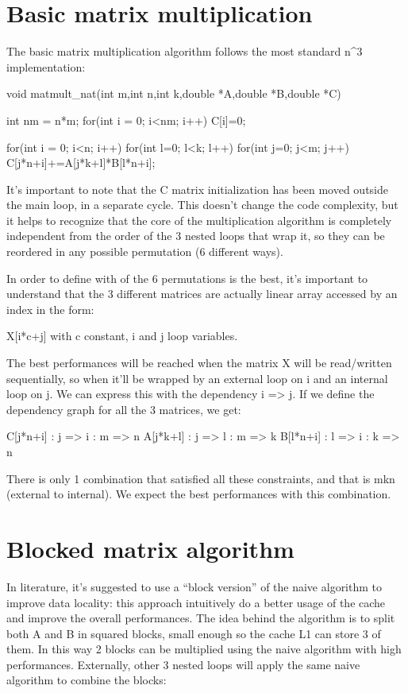 \section{Basic matrix multiplication}
The basic matrix multiplication algorithm follows the most standard n^3 implementation:


void matmult_nat(int m,int n,int k,double *A,double *B,double *C)
{
  int nm = n*m;
  for(int i = 0; i<nm; i++)  
  {
    C[i]=0;
  }

  for(int i = 0; i<n; i++)  
    for(int l=0; l<k; l++)
      for(int j=0; j<m; j++)
        C[j*n+i]+=A[j*k+l]*B[l*n+i];
}


It’s important to note that the C matrix initialization has been moved outside the main loop, in a separate cycle. This doesn’t change the code complexity, but it helps to recognize that the core of the multiplication algorithm is completely independent from the order of the 3 nested loops that wrap it, so they can be reordered in any possible permutation (6 different ways).

In order to define with of the 6 permutations is the best, it’s important to understand that the 3 different matrices are actually linear array accessed by an index in the form:

X[i*c+j] with c constant, i and j loop variables.

The best performances will be reached when the matrix X will be read/written sequentially, so when it’ll be wrapped by an external loop on i and an internal loop on j. We can express this with the dependency i => j.
If we define the dependency graph for all the 3 matrices, we get:

C[j*n+i] : j => i : m => n
A[j*k+l] : j => l : m => k
B[l*n+i] : l => i : k => n

There is only 1 combination that satisfied all these constraints, and that is mkn (external to internal). We expect the best performances with this combination.

\section{Blocked matrix algorithm}

In literature, it’s suggested to use a “block version” of the naive algorithm to improve data locality: this approach intuitively do a better usage of the cache and improve the overall performances.
The idea behind the algorithm is to split both A and B in squared blocks, small enough so the cache L1 can store 3 of them. In this way 2 blocks can be multiplied using the naive algorithm with high performances.
Externally, other 3 nested loops will apply the same naive algorithm to combine the blocks:

